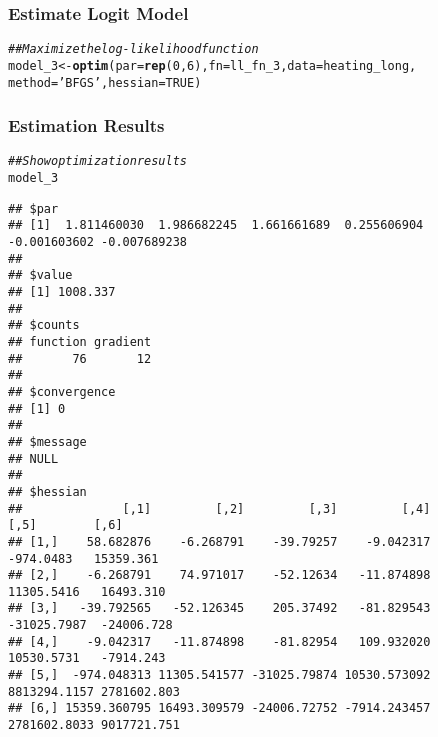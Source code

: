 \documentclass{beamer}\usepackage[]{graphicx}\usepackage[]{xcolor}
\makeatletter
\newcommand{\hlnum}[1]{\textcolor[rgb]{0.686,0.059,0.569}{#1}}%
\newcommand{\hlstr}[1]{\textcolor[rgb]{0.192,0.494,0.8}{#1}}%
\newcommand{\hlcom}[1]{\textcolor[rgb]{0.678,0.584,0.686}{\textit{#1}}}%
\newcommand{\hlstd}[1]{\textcolor[rgb]{0.345,0.345,0.345}{#1}}%
\newcommand{\hlkwb}[1]{\textcolor[rgb]{0.69,0.353,0.396}{#1}}%
\newcommand{\hlkwc}[1]{\textcolor[rgb]{0.333,0.667,0.333}{#1}}%
\newcommand{\hlkwd}[1]{\textcolor[rgb]{0.737,0.353,0.396}{\textbf{#1}}}%
\newenvironment{kframe}{%
 \def\at@end@of@kframe{}%
 \ifinner\ifhmode%
  \def\at@end@of@kframe{\end{minipage}}%
  \begin{minipage}{\columnwidth}%
 \fi\fi%
 \def\FrameCommand##1{\hskip\@totalleftmargin \hskip-\fboxsep
 \colorbox{shadecolor}{##1}\hskip-\fboxsep
     \hskip-\linewidth \hskip-\@totalleftmargin \hskip\columnwidth}%
 \MakeFramed {\advance\hsize-\width
   \@totalleftmargin\z@ \linewidth\hsize
   \@setminipage}}%
 {\par\unskip\endMakeFramed%
 \at@end@of@kframe}
\newenvironment{knitrout}{}{} %
\makeatother
\begin{document}
\begin{frame}[fragile]\frametitle{Estimate Logit Model}
\begin{knitrout}\footnotesize
{}\color{fgcolor}\begin{kframe}
\begin{alltt}
\hlcom{## Maximize the log-likelihood function}
\hlstd{model_3} \hlkwb{<-} \hlkwd{optim}\hlstd{(}\hlkwc{par} \hlstd{=} \hlkwd{rep}\hlstd{(}\hlnum{0}\hlstd{,} \hlnum{6}\hlstd{),} \hlkwc{fn} \hlstd{= ll_fn_3,} \hlkwc{data} \hlstd{= heating_long,}
                 \hlkwc{method} \hlstd{=} \hlstr{'BFGS'}\hlstd{,} \hlkwc{hessian} \hlstd{=} \hlnum{TRUE}\hlstd{)}
\end{alltt}
\end{kframe}
\end{knitrout}
\end{frame}

\begin{frame}[fragile]\frametitle{Estimation Results}
    \vspace{1ex}
    
\begin{knitrout}\tiny
{}\color{fgcolor}\begin{kframe}
\begin{alltt}
\hlcom{## Show optimization results}
\hlstd{model_3}
\end{alltt}
\begin{verbatim}
## $par
## [1]  1.811460030  1.986682245  1.661661689  0.255606904 -0.001603602 -0.007689238
## 
## $value
## [1] 1008.337
## 
## $counts
## function gradient 
##       76       12 
## 
## $convergence
## [1] 0
## 
## $message
## NULL
## 
## $hessian
##              [,1]         [,2]         [,3]         [,4]         [,5]        [,6]
## [1,]    58.682876    -6.268791    -39.79257    -9.042317    -974.0483   15359.361
## [2,]    -6.268791    74.971017    -52.12634   -11.874898   11305.5416   16493.310
## [3,]   -39.792565   -52.126345    205.37492   -81.829543  -31025.7987  -24006.728
## [4,]    -9.042317   -11.874898    -81.82954   109.932020   10530.5731   -7914.243
## [5,]  -974.048313 11305.541577 -31025.79874 10530.573092 8813294.1157 2781602.803
## [6,] 15359.360795 16493.309579 -24006.72752 -7914.243457 2781602.8033 9017721.751
\end{verbatim}
\end{kframe}
\end{knitrout}
\end{frame}
\end{document}
